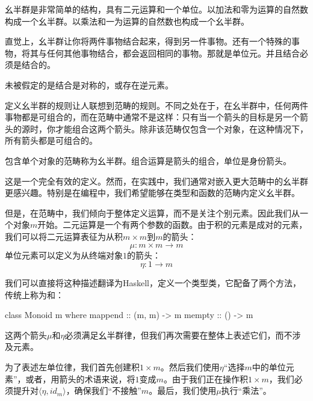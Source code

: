 \documentclass[DaoFP]{subfiles}
\begin{document}
 幺半群是非常简单的结构，具有二元运算和一个单位。以加法和零为运算的自然数构成一个幺半群。以乘法和一为运算的自然数也构成一个幺半群。

 直觉上，幺半群让你将两件事物结合起来，得到另一件事物。还有一个特殊的事物，将其与任何其他事物结合，都会返回相同的事物。那就是单位元。并且结合必须是结合的。

 未被假定的是结合是对称的，或存在逆元素。

 定义幺半群的规则让人联想到范畴的规则。不同之处在于，在幺半群中，任何两件事物都是可组合的，而在范畴中通常不是这样：只有当一个箭头的目标是另一个箭头的源时，你才能组合这两个箭头。除非该范畴仅包含一个对象，在这种情况下，所有箭头都是可组合的。

 包含单个对象的范畴称为幺半群。组合运算是箭头的组合，单位是身份箭头。

 这是一个完全有效的定义。然而，在实践中，我们通常对嵌入更大范畴中的幺半群更感兴趣。特别是在编程中，我们希望能够在类型和函数的范畴内定义幺半群。

 但是，在范畴中，我们倾向于整体定义运算，而不是关注个别元素。因此我们从一个对象$m$开始。二元运算是一个有两个参数的函数。由于积的元素是成对的元素，我们可以将二元运算表征为从积$m \times m$到$m$的箭头：
 \[ \mu \colon m \times m \to m \]
 单位元素可以定义为从终端对象$1$的箭头：
 \[ \eta \colon 1 \to m \]

 我们可以直接将这种描述翻译为Haskell，定义一个类型类，它配备了两个方法，传统上称为和：
 \begin{haskell}
  class Monoid m where
  mappend :: (m, m) -> m
  mempty  :: () -> m
 \end{haskell}

 这两个箭头$\mu$和$\eta$必须满足幺半群律，但我们再次需要在整体上表述它们，而不涉及元素。

 为了表述左单位律，我们首先创建积$1 \times m$。然后我们使用$\eta$“选择$m$中的单位元素”，或者，用箭头的术语来说，将$1$变成$m$。由于我们正在操作积$1 \times m$，我们必须提升对$\langle \eta, id_m \rangle$，确保我们“不接触”$m$。最后，我们使用$\mu$执行“乘法”。
\end{document}
